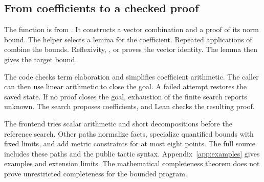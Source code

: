 

\subsection{From coefficients to a checked proof}
The function  is from .
It constructs a vector combination and a proof of its norm bound.
The helper  selects a lemma for the coefficient.
Repeated applications of  combine the bounds.
Reflexivity, , or  proves the vector identity.
The lemma  then gives the target bound.

The code checks term elaboration and simplifies coefficient arithmetic.
The caller can then use linear arithmetic to close the goal.
A failed attempt restores the saved state.
If no proof closes the goal, exhaustion of the finite search reports unknown.
The search proposes coefficients, and Lean checks the resulting proof.



The frontend tries scalar arithmetic and short decompositions before the reference search.
Other paths normalize facts, specialize quantified bounds with fixed limits, and add metric constraints for at most eight points.
The full source includes these paths and the public tactic syntax.
Appendix~\ref{app:examples} gives examples and extension limits.
The mathematical completeness theorem does not prove unrestricted completeness for the bounded program.
